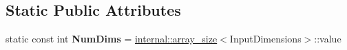 \subsection*{Static Public Attributes}
\begin{DoxyCompactItemize}
\item 
\mbox{\label{struct_eigen_1_1_tensor_evaluator_3_01const_01_tensor_tuple_reducer_op_3_01_reduce_op_00_01_dimsa9704c68eb01932857866cfd0005279c_aa85a3e6d9bc5239bb764a04f87e58eed}} 
static const int {\bfseries Num\+Dims} = \hyperlink{struct_eigen_1_1internal_1_1array__size}{internal\+::array\+\_\+size}$<$Input\+Dimensions$>$\+::value
\end{DoxyCompactItemize}
